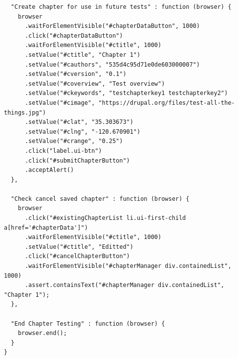 \documentclass[12pt]{ucthesis}
\begin{document}
\begin{lstlisting}
  "Create chapter for use in future tests" : function (browser) {
    browser
      .waitForElementVisible("#chapterDataButton", 1000)
      .click("#chapterDataButton")
      .waitForElementVisible("#ctitle", 1000)
      .setValue("#ctitle", "Chapter 1")
      .setValue("#cauthors", "535d4c95d71e0de603000007")
      .setValue("#cversion", "0.1")
      .setValue("#coverview", "Test overview")
      .setValue("#ckeywords", "testchapterkey1 testchapterkey2")
      .setValue("#cimage", "https://drupal.org/files/test-all-the-things.jpg")
      .setValue("#clat", "35.303673")
      .setValue("#clng", "-120.670901")
      .setValue("#crange", "0.25")
      .click("label.ui-btn")
      .click("#submitChapterButton")
      .acceptAlert()
  },

  "Check cancel saved chapter" : function (browser) {
    browser
      .click("#existingChapterList li.ui-first-child a[href='#chapterData']")
      .waitForElementVisible("#ctitle", 1000)
      .setValue("#ctitle", "Editted")
      .click("#cancelChapterButton")
      .waitForElementVisible("#chapterManager div.containedList", 1000)
      .assert.containsText("#chapterManager div.containedList", "Chapter 1");
  },

  "End Chapter Testing" : function (browser) {
    browser.end();
  }
}
\end{lstlisting}
\end{document}
